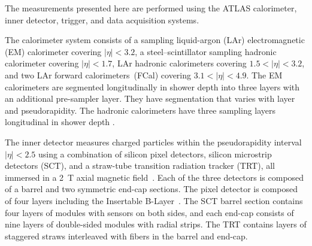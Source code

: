 

The measurements presented here are performed using the ATLAS calorimeter, inner detector, trigger,
and data acquisition systems. 

The calorimeter system consists of a sampling liquid-argon (LAr) electromagnetic (EM) calorimeter covering $|\eta|<3.2$, a
steel--scintillator sampling hadronic calorimeter covering $|\eta| <1.7$, LAr hadronic calorimeters covering $1.5 < |\eta| < 3.2$, and
two LAr forward calorimeters~(FCal) covering $3.1 < |\eta| < 4.9$. 
The EM calorimeters are segmented longitudinally in shower depth into three
layers with an additional pre-sampler layer. They
have segmentation that varies with layer and pseudorapidity. 
The hadronic calorimeters have three sampling layers longitudinal
in shower depth \cite{Aad:2008zzm}.

The inner detector measures charged particles  within the pseudorapidity interval  $|\eta|<2.5$ using a combination of silicon pixel detectors, silicon microstrip detectors (SCT), and a straw-tube transition radiation tracker (TRT), all immersed in a 2~T axial magnetic field~\cite{Aad:2008zzm}. Each of the three detectors is composed of a barrel and two symmetric end-cap sections. The pixel detector is composed of four layers including the Insertable B-Layer~\cite{ibl1,ibl2}. The SCT barrel section contains four layers of modules with sensors on both sides, and each end-cap consists of nine layers of double-sided modules with radial strips. The TRT contains layers of staggered straws interleaved with fibers in the barrel and end-cap.



